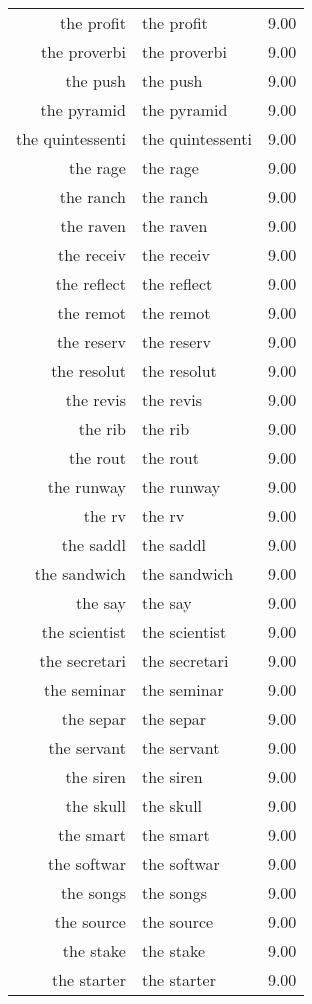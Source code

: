 \begin{table}[ht]
\begin{tabular}{rlr}
  the profit & the profit & 9.00 \\ 
  the proverbi & the proverbi & 9.00 \\ 
  the push & the push & 9.00 \\ 
  the pyramid & the pyramid & 9.00 \\ 
  the quintessenti & the quintessenti & 9.00 \\ 
  the rage & the rage & 9.00 \\ 
  the ranch & the ranch & 9.00 \\ 
  the raven & the raven & 9.00 \\ 
  the receiv & the receiv & 9.00 \\ 
  the reflect & the reflect & 9.00 \\ 
  the remot & the remot & 9.00 \\ 
  the reserv & the reserv & 9.00 \\ 
  the resolut & the resolut & 9.00 \\ 
  the revis & the revis & 9.00 \\ 
  the rib & the rib & 9.00 \\ 
  the rout & the rout & 9.00 \\ 
  the runway & the runway & 9.00 \\ 
  the rv & the rv & 9.00 \\ 
  the saddl & the saddl & 9.00 \\ 
  the sandwich & the sandwich & 9.00 \\ 
  the say & the say & 9.00 \\ 
  the scientist & the scientist & 9.00 \\ 
  the secretari & the secretari & 9.00 \\ 
  the seminar & the seminar & 9.00 \\ 
  the separ & the separ & 9.00 \\ 
  the servant & the servant & 9.00 \\ 
  the siren & the siren & 9.00 \\ 
  the skull & the skull & 9.00 \\ 
  the smart & the smart & 9.00 \\ 
  the softwar & the softwar & 9.00 \\ 
  the songs & the songs & 9.00 \\ 
  the source & the source & 9.00 \\ 
  the stake & the stake & 9.00 \\ 
  the starter & the starter & 9.00 \\ 

\end{tabular}
\end{table}
